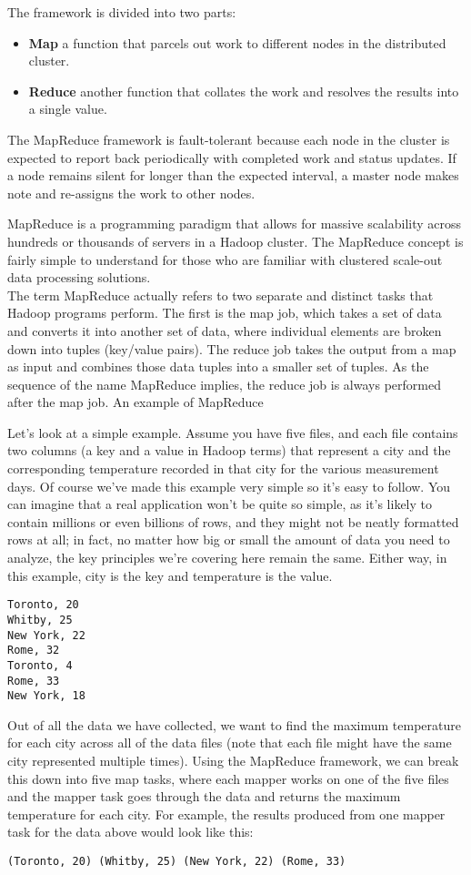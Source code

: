 \documentclass[12pt]{article}
\begin{document}
The framework is divided into two parts:
\begin{itemize}
\item \textbf{Map} a function that parcels out work to different nodes in the distributed cluster.
\item \textbf{Reduce} another function that collates the work and resolves the results into a single value.
\end{itemize}

The MapReduce framework is fault-tolerant because each node in the cluster is expected to report back periodically with completed work and status updates. If a node remains silent for longer than the expected interval, a master node makes note and re-assigns the work to other nodes.


MapReduce is a programming paradigm that allows for massive scalability across hundreds or thousands of servers in a Hadoop cluster. The MapReduce concept is fairly simple to understand for those who are familiar with clustered scale-out data processing solutions.
\\
The term MapReduce actually refers to two separate and distinct tasks that Hadoop programs perform. The first is the map job, which takes a set of data and converts it into another set of data, where individual elements are broken down into tuples (key/value pairs). The reduce job takes the output from a map as input and combines those data tuples into a smaller set of tuples. As the sequence of the name MapReduce implies, the reduce job is always performed after the map job.
An example of MapReduce

Let’s look at a simple example. Assume you have five files, and each file contains two columns (a key and a value in Hadoop terms) that represent a city and the corresponding temperature recorded in that city for the various measurement days. Of course we’ve made this example very simple so it’s easy to follow. You can imagine that a real application won’t be quite so simple, as it’s likely to contain millions or even billions of rows, and they might not be neatly formatted rows at all; in fact, no matter how big or small the amount of data you need to analyze, the key principles we’re covering here remain the same. Either way, in this example, city is the key and tempera­ture is the value.
\begin{verbatim}
Toronto, 20 
Whitby, 25 
New York, 22 
Rome, 32 
Toronto, 4 
Rome, 33 
New York, 18
\end{verbatim}


Out of all the data we have collected, we want to find the maximum tem­perature for each city across all of the data files (note that each file might have the same city represented multiple times). Using the MapReduce framework, we can break this down into five map tasks, where each mapper works on one of the five files and the mapper task goes through the data and returns the maximum temperature for each city. For example, the results produced from one mapper task for the data above would look like this:
\begin{verbatim}
(Toronto, 20) (Whitby, 25) (New York, 22) (Rome, 33)
\end{verbatim}
\end{document}
